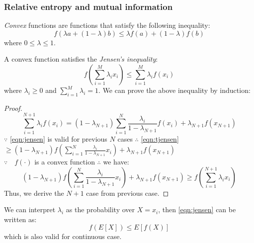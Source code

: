 \subsubsection{Relative entropy and mutual information}
\begin{definition}
\emph{Convex} functions are functions that satisfy the following
inequality:
\begin{equation}
f(\lambda{}a+(1-\lambda)b)\leq{}\lambda{}f(a)+(1-\lambda)f(b)
\label{eqn:convexity}
\end{equation}
where $0\leq{}\lambda{}\leq{}1$.
\end{definition}


A convex function satisfies the \emph{Jensen's inequality}:
\begin{equation}
f(\sum_{i=1}^{M}\lambda_{i}x_{i})\leq{}\sum_{i=1}^{M}\lambda_{i}f(x_i)
\label{eqn:jensen}
\end{equation}
where $\lambda_{i}\geq{}0$ and $\sum_{i=1}^{M}\lambda_{i}=1$. We can
prove the above inequality by induction:
\begin{proof}
\begin{equation}
\sum_{i=1}^{N+1}\lambda_{i}f(x_i)=(1-\lambda_{N+1})\sum_{i=1}^{N}\frac{\lambda_{i}}{1-\lambda_{N+1}}f(x_i)+\lambda_{N+1}f(x_{N+1})
\label{eqn:tjensen}
\end{equation}
$\because$ \eqref{eqn:jensen} is valid for previous $N$ cases
$\therefore{}$ \eqref{eqn:tjensen}
$\geq{}(1-\lambda_{N+1})f(\sum_{i=1}^{N}\frac{\lambda_{i}}{1-\lambda_{N+1}}x_{i})+\lambda_{N+1}f(x_{N+1})$\\
$\because{}\quad{}f(\cdot)$ is a convex function $\therefore{}$ we
have:
\begin{equation}
(1-\lambda_{N+1})f(\sum_{i=1}^{N}\frac{\lambda_{i}}{1-\lambda_{N+1}}x_{i})+\lambda_{N+1}f(x_{N+1})\geq{}f(\sum_{i=1}^{N+1}\lambda_{i}x_{i})
\label{eqn:t2jensen}
\end{equation}
Thus, we derive the $N+1$ case from previous case.
\end{proof}
We can interpret $\lambda_{i}$ as the probability over $X=x_{i}$, then
\eqref{eqn:jensen} can be written as:
\begin{equation}
f(E[X])\leq{}E[f(X)]
\label{eqn:expectationjensen}
\end{equation}
which is also valid for continuous case.


